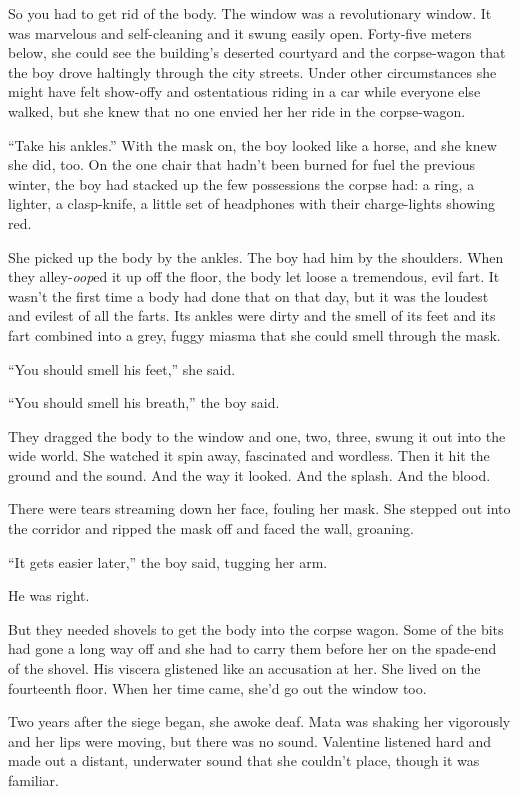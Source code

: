 So you had to get rid of the body. The window was a revolutionary
window. It was marvelous and self-cleaning and it swung easily
open. Forty-five meters below, she could see the building’s
deserted courtyard and the corpse-wagon that the boy drove
haltingly through the city streets. Under other circumstances she
might have felt show-offy and ostentatious riding in a car while
everyone else walked, but she knew that no one envied her her ride
in the corpse-wagon.

“Take his ankles.” With the mask on, the boy looked like a horse,
and she knew she did, too. On the one chair that hadn’t been burned
for fuel the previous winter, the boy had stacked up the few
possessions the corpse had: a ring, a lighter, a clasp-knife, a
little set of headphones with their charge-lights showing red.

She picked up the body by the ankles. The boy had him by the
shoulders. When they alley-\emph{oop}ed it up off the floor, the
body let loose a tremendous, evil fart. It wasn’t the first time a
body had done that on that day, but it was the loudest and evilest
of all the farts. Its ankles were dirty and the smell of its feet
and its fart combined into a grey, fuggy miasma that she could
smell through the mask.

“You should smell his feet,” she said.

“You should smell his breath,” the boy said.

They dragged the body to the window and one, two, three, swung it
out into the wide world. She watched it spin away, fascinated and
wordless. Then it hit the ground and the sound. And the way it
looked. And the splash. And the blood.

There were tears streaming down her face, fouling her mask. She
stepped out into the corridor and ripped the mask off and faced the
wall, groaning.

“It gets easier later,” the boy said, tugging her arm.

He was right.

But they needed shovels to get the body into the corpse wagon. Some
of the bits had gone a long way off and she had to carry them
before her on the spade-end of the shovel. His viscera glistened
like an accusation at her. She lived on the fourteenth floor. When
her time came, she’d go out the window too.

\tb

Two years after the siege began, she awoke deaf. Mata was shaking
her vigorously and her lips were moving, but there was no sound.
Valentine listened hard and made out a distant, underwater sound
that she couldn’t place, though it was familiar.

